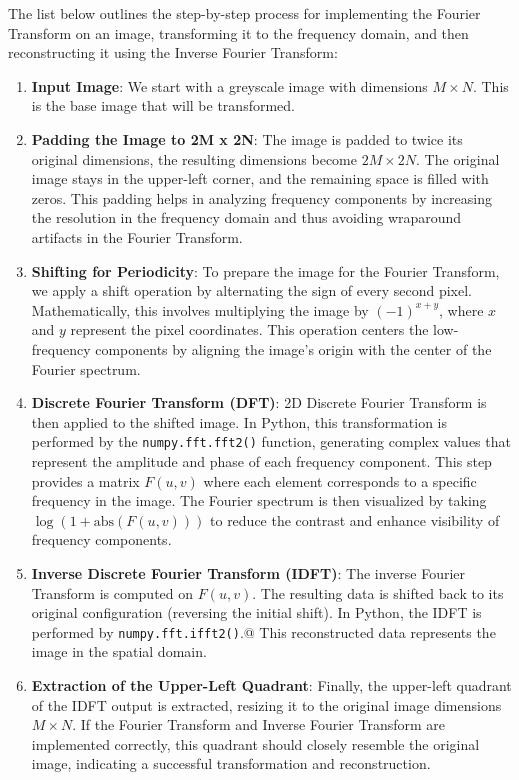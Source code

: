 \documentclass[a4paper,12pt]{article}
\begin{document}
The list below outlines the step-by-step process for implementing the Fourier Transform on an image, transforming it to the frequency domain, and then reconstructing it using the Inverse Fourier Transform:

\begin{enumerate}
    \item \textbf{Input Image}:
        We start with a greyscale image with dimensions \( M \times N \). This is the base image that will be transformed.
    \item \textbf{Padding the Image to 2M x 2N}:
        The image is padded to twice its original dimensions, the resulting dimensions become \( 2M \times 2N \). The original image stays in the upper-left corner, and the remaining space is filled with zeros. This padding helps in analyzing frequency components by increasing the resolution in the frequency domain and thus avoiding wraparound artifacts in the Fourier Transform.
    \item \textbf{Shifting for Periodicity}:
        To prepare the image for the Fourier Transform, we apply a shift operation by alternating the sign of every second pixel. Mathematically, this involves multiplying the image by \( (-1)^{x + y} \), where \( x \) and \( y \) represent the pixel coordinates. This operation centers the low-frequency components by aligning the image's origin with the center of the Fourier spectrum.
    \item \textbf{Discrete Fourier Transform (DFT)}:
        2D Discrete Fourier Transform is then applied to the shifted image. In Python, this transformation is performed by the \texttt{numpy.fft.fft2()} function, generating complex values that represent the amplitude and phase of each frequency component. This step provides a matrix \( F(u, v) \) where each element corresponds to a specific frequency in the image. The Fourier spectrum is then visualized by taking \( \log(1 + \text{abs}(F(u, v))) \) to reduce the contrast and enhance visibility of frequency components.
    \item \textbf{Inverse Discrete Fourier Transform (IDFT)}:
        The inverse Fourier Transform is computed on \( F(u, v) \). The resulting data is shifted back to its original configuration (reversing the initial shift). In Python, the IDFT is performed by \texttt{numpy.fft.ifft2()}.@
        This reconstructed data represents the image in the spatial domain.
    \item \textbf{Extraction of the Upper-Left Quadrant}:
        Finally, the upper-left quadrant of the IDFT output is extracted, resizing it to the original image dimensions \( M \times N \). If the Fourier Transform and Inverse Fourier Transform are implemented correctly, this quadrant should closely resemble the original image, indicating a successful transformation and reconstruction.
\end{enumerate}
\end{document}
